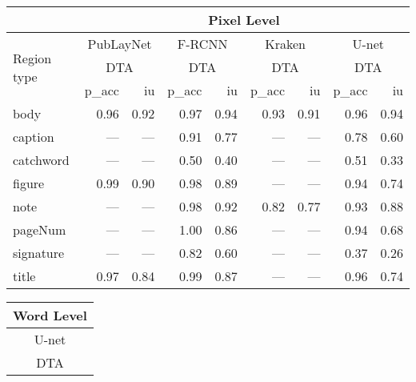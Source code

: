 {  \begin{center}\tiny
    \tabcolsep=2pt
    \begin{tabular}[t]{l|rr|rr|rr|rr}
      \multicolumn{1}{c}{} & \multicolumn{8}{c}{\scriptsize Pixel Level} \\[.2em]
      \toprule
      \multirow{3}{*}{Region type}  & \multicolumn{2}{c}{PubLayNet} & \multicolumn{2}{c}{F-RCNN} & \multicolumn{2}{c}{Kraken} & \multicolumn{2}{c}{U-net} \\
        & \multicolumn{2}{c}{DTA} & \multicolumn{2}{c}{DTA} & \multicolumn{2}{c}{DTA} & \multicolumn{2}{c}{DTA} \\
                & p\_acc & iu & p\_acc & iu & p\_acc & iu & p\_acc & iu \\
      \midrule
      \rowcolor{LightCyan}
      body      & 0.96 & 0.92 & 0.97 & 0.94 & 0.93 & 0.91 & 0.96 & 0.94 \\
      caption   & ---  & ---  & 0.91 & 0.77 & ---  & ---  & 0.78 & 0.60 \\
      \rowcolor{LightCyan}
      catchword & ---  & ---  & 0.50 & 0.40 & ---  & ---  & 0.51 & 0.33 \\
      figure    & 0.99 & 0.90 & 0.98 & 0.89 & ---  & ---  & 0.94 & 0.74 \\
      \rowcolor{LightCyan}
      note      & ---  & ---  & 0.98 & 0.92 & 0.82 & 0.77 & 0.93 & 0.88 \\
      pageNum   & ---  & ---  & 1.00 & 0.86 & ---  & ---  & 0.94 & 0.68 \\
      \rowcolor{LightCyan}
      signature & ---  & ---  & 0.82 & 0.60 & ---  & ---  & 0.37 & 0.26 \\
      title     & 0.97 & 0.84 & 0.99 & 0.87 & ---  & ---  & 0.96 & 0.74 \\
      \bottomrule
    \end{tabular}%
    \hspace{1em}%
    \begin{tabular}[t]{rrr}
      \multicolumn{3}{c}{\scriptsize Word Level} \\[.2em]
      \toprule
      \multicolumn{3}{c}{U-net} \\
      \multicolumn{3}{c}{DTA} \\

\end{tabular}
\end{center}}
